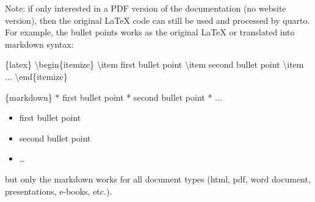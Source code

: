 \documentclass[
  letterpaper,
  DIV=11,
  numbers=noendperiod]{scrreprt}
\newenvironment{Shaded}{\begin{snugshade}}{\end{snugshade}}
\newcommand{\InformationTok}[1]{\textcolor[rgb]{0.37,0.37,0.37}{#1}}
\newcommand{\NormalTok}[1]{\textcolor[rgb]{0.00,0.23,0.31}{#1}}
\newcommand{\SpecialStringTok}[1]{\textcolor[rgb]{0.13,0.47,0.30}{#1}}
\providecommand{\tightlist}{%
  \setlength{\itemsep}{0pt}\setlength{\parskip}{0pt}}
\begin{document}
\begin{tcolorbox}[enhanced jigsaw, arc=.35mm, bottomrule=.15mm, bottomtitle=1mm, breakable, colback=white, colbacktitle=quarto-callout-note-color!10!white, colframe=quarto-callout-note-color-frame, coltitle=black, left=2mm, leftrule=.75mm, opacityback=0, opacitybacktitle=0.6, rightrule=.15mm, title=\textcolor{quarto-callout-note-color}{\faInfo}\hspace{0.5em}{Note}, titlerule=0mm, toprule=.15mm, toptitle=1mm]

Note: if only interested in a PDF version of the documentation (no
website version), then the original LaTeX code can still be used and
processed by quarto. For example, the bullet points works as the
original LaTeX or translated into markdown syntax:

\begin{Shaded}
\begin{Highlighting}[]
\InformationTok{\textasciigrave{}\textasciigrave{}\textasciigrave{}\{latex\}}
\InformationTok{\textbackslash{}begin\{itemize\}}
\InformationTok{    \textbackslash{}item first bullet point}
\InformationTok{    \textbackslash{}item second bullet point}
\InformationTok{    \textbackslash{}item ...}
\InformationTok{\textbackslash{}end\{itemize\}}
\InformationTok{\textasciigrave{}\textasciigrave{}\textasciigrave{}}
\end{Highlighting}
\end{Shaded}

\begin{Shaded}
\begin{Highlighting}[]
\InformationTok{\textasciigrave{}\textasciigrave{}\textasciigrave{}\{markdown\}}
\SpecialStringTok{* }\NormalTok{first bullet point}
\SpecialStringTok{* }\NormalTok{second bullet point}
\SpecialStringTok{* }\NormalTok{...}
\InformationTok{\textasciigrave{}\textasciigrave{}\textasciigrave{}}
\end{Highlighting}
\end{Shaded}

\begin{itemize}
\tightlist
\item
  first bullet point
\item
  second bullet point
\item
  \ldots{}
\end{itemize}

but only the markdown works for all document types (html, pdf, word
document, presentations, e-books, etc.).

\end{tcolorbox}
\end{document}
